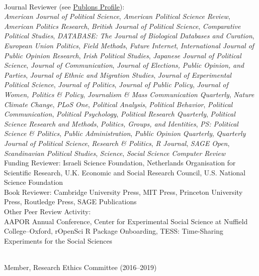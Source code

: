 \documentclass[12pt]{article}
\renewcommand{\section}[1]{\pagebreak[3]%
    \llap{\scshape\smash{\parbox[t]{\marginparwidth}{\raggedright {\color{lg}#1}}}}%
    \vspace{-\baselineskip}\par}
\newcommand{\topic}[1]{\pagebreak[3]\indent {\color{lg}{\footnotesize #1 }}\\}
\newcommand{\entry}[1]{\indent {\color{lg}\guillemotright}\hspace{2pt}#1\vspace{.25em}\\}
\begin{document}
\topic{Peer Review Activity}
	\entry{Journal Reviewer (see \href{https://publons.com/a/634082/}{Publons Profile}):\\\textit{American Journal of Political Science}, \textit{American Political Science Review}, \textit{American Politics Research}, \textit{British Journal of Political Science}, \textit{Comparative Political Studies}, \textit{DATABASE: The Journal of Biological Databases and Curation}, \textit{European Union Politics}, \textit{Field Methods}, \textit{Future Internet}, \textit{International Journal of Public Opinion Research}, \textit{Irish Political Studies}, \textit{Japanese Journal of Political Science}, \textit{Journal of Communication}, \textit{Journal of Elections, Public Opinion, and Parties}, \textit{Journal of Ethnic and Migration Studies}, \textit{Journal of Experimental Political Science}, \textit{Journal of Politics}, \textit{Journal of Public Policy}, \textit{Journal of Women, Politics \& Policy}, \textit{Journalism \& Mass Communication Quarterly}, \textit{Nature Climate Change}, \textit{PLoS One}, \textit{Political Analysis}, \textit{Political Behavior}, \textit{Political Communication}, \textit{Political Psychology}, \textit{Political Research Quarterly}, \textit{Political Science Research and Methods}, \textit{Politics, Groups, and Identities}, \textit{PS: Political Science \& Politics}, \textit{Public Administration}, \textit{Public Opinion Quarterly}, \textit{Quarterly Journal of Political Science}, \textit{Research \& Politics}, \textit{R Journal}, \textit{SAGE Open}, \textit{Scandinavian Political Studies}, \textit{Science}, \textit{Social Science Computer Review}}
	\entry{Funding Reviewer: Israeli Science Foundation, Netherlands Organisation for Scientific Research, U.K. Economic and Social Research Council, U.S. National Science Foundation}
	\entry{Book Reviewer: Cambridge University Press, MIT Press, Princeton University Press, Routledge Press, SAGE Publications}
	\entry{Other Peer Review Activity:\\ AAPOR Annual Conference, Center for Experimental Social Science at Nuffield College--Oxford, rOpenSci R Package Onboarding, TESS: Time-Sharing Experiments for the Social Sciences}

\section{Institutional\\ \& Professional Service}
\topic{Institutional (London School of Economics and Political Science)}
	\entry{Member, Research Ethics Committee (2016--2019)}
	
\end{document}
